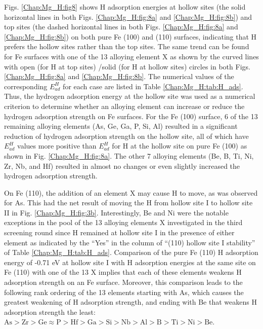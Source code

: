 Figs. \ref{Chap:Mg_H:fig8} shows H adsorption energies at hollow sites (the solid horizontal lines in both Figs. \ref{Chap:Mg_H:fig:8a} and \ref{Chap:Mg_H:fig:8b}) and top sites (the dashed horizontal lines in both Figs. \ref{Chap:Mg_H:fig:8a} and \ref{Chap:Mg_H:fig:8b}) on both pure Fe (100) and (110) surfaces, indicating that H prefers the hollow sites rather than the top sites. The same trend can be found for Fe surfaces with one of the 13 alloying element X as shown by the curved lines with open (for H at top sites) /solid (for H at hollow sites) circles in both Figs. \ref{Chap:Mg_H:fig:8a} and \ref{Chap:Mg_H:fig:8b}.  The numerical values of the corresponding $E_{ad}^H$ for each case are listed in Table \ref{Chap:Mg_H:tab:H_ads}. Thus, the hydrogen adsorption energy at the hollow site was used as a numerical criterion to determine whether an alloying element can increase or reduce the hydrogen adsorption strength on Fe surfaces. For the Fe (100) surface, 6 of the 13 remaining alloying elements (As, Ge, Ga, P, Si, Al) resulted in a significant reduction of hydrogen adsorption strength on the hollow site, all of which have $E_{ad}^H$ values more positive than $E_{ad}^H$ for H at the hollow site on pure Fe (100) as shown in Fig. \ref{Chap:Mg_H:fig:8a}. The other 7 alloying elements (Be, B, Ti, Ni, Zr, Nb, and Hf) resulted in almost no changes or even slightly increased the hydrogen adsorption strength.

On Fe (110), the addition of an element X may cause H to move, as was observed for As. This had the net result of moving the H from hollow site I to hollow site II in Fig. \ref{Chap:Mg_H:fig:3b}. Interestingly, Be and Ni were the notable exceptions in the pool of the 13 alloying elements X investigated in the third screening round since H remained at hollow site I in the presence of either element as indicated by the “Yes” in the column of “(110) hollow site I stability” of Table \ref{Chap:Mg_H:tab:H_ads}. Comparison of the pure Fe (110) H adsorption energy of -0.71 eV at hollow site I with H adsorption energies at the same site on Fe (110) with one of the 13 X implies that each of these elements weakens H adsorption strength on an Fe surface. Moreover, this comparison leads to the following rank ordering of the 13 elements starting with As, which causes the greatest weakening of H adsorption strength, and ending with Be that weakens H adsorption strength the least: $\text{As} > \text{Zr} > \text{Ge} \approx \text{P} > \text{Hf} > \text{Ga} > \text{Si} > \text{Nb} > \text{Al} > \text{B} > \text{Ti} > \text{Ni} > \text{Be}$.

